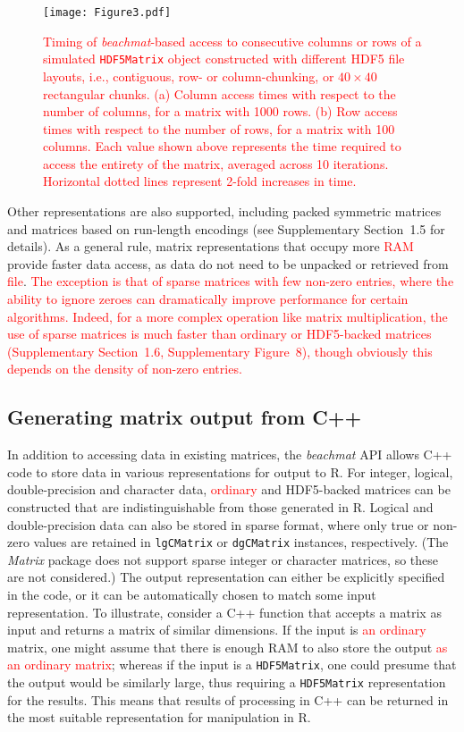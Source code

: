 \documentclass[10pt,letterpaper]{article}
\newcommand{\suppfigmatmult}{8}
\newcommand{\suppsecother}{1.5}
\newcommand{\suppsecmatmult}{1.6}
\newcommand{\beachmat}{\textit{beachmat}}
\newcommand{\code}[1]{\texttt{#1}}
\newcommand{\revised}[1]{\textcolor{red}{#1}}
\begin{document}
\begin{figure}[btp]
    \begin{center}
        \texttt{[image: Figure3.pdf]}
    \end{center}
    \caption{\revised{Timing of \beachmat{}-based access to consecutive columns or rows of a simulated \code{HDF5Matrix} object constructed with different HDF5 file layouts, 
i.e., contiguous, row- or column-chunking, or $40\times40$ rectangular chunks.
(a) Column access times with respect to the number of columns, for a matrix with 1000 rows.
(b) Row access times with respect to the number of rows, for a matrix with 100 columns.
Each value shown above represents the time required to access the entirety of the matrix, averaged across 10 iterations.
Horizontal dotted lines represent 2-fold increases in time.}}
\label{fig:hdf5}
\end{figure}

Other representations are also supported, including packed symmetric matrices and matrices based on run-length encodings (see Supplementary Section~\suppsecother{} for details).
As a general rule, matrix representations that occupy more \revised{RAM} provide faster data access, as data do not need to be unpacked or retrieved from \revised{file}.
\revised{The exception is that of sparse matrices with few non-zero entries, where the ability to ignore zeroes can dramatically improve performance for certain algorithms.
Indeed, for a more complex operation like matrix multiplication, the use of sparse matrices is much faster than ordinary or HDF5-backed matrices (Supplementary Section~\suppsecmatmult{}, Supplementary Figure~\suppfigmatmult{}), though obviously this depends on the density of non-zero entries.}

\subsection*{Generating matrix output from C++}
In addition to accessing data in existing matrices, the \beachmat{} API allows C++ code to store data in various representations for output to R.
For integer, logical, double-precision and character data, \revised{ordinary} and HDF5-backed matrices can be constructed that are indistinguishable from those generated in R.
Logical and double-precision data can also be stored in sparse format, where only true or non-zero values are retained in \code{lgCMatrix} or \code{dgCMatrix} instances, respectively.
(The \textit{Matrix} package does not support sparse integer or character matrices, so these are not considered.)
The output representation can either be explicitly specified in the code, or it can be automatically chosen to match some input representation.
To illustrate, consider a C++ function that accepts a matrix as input and returns a matrix of similar dimensions.
If the input is \revised{an ordinary} matrix, one might assume that there is enough RAM to also store the output \revised{as an ordinary matrix};
whereas if the input is a \code{HDF5Matrix}, one could presume that the output would be similarly large, thus requiring a \code{HDF5Matrix} representation for the results.
This means that results of processing in C++ can be returned in the most suitable representation for manipulation in R.
 
\end{document}
